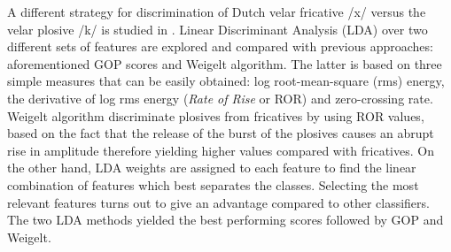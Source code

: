 A different strategy for discrimination of Dutch velar fricative /x/ versus the velar plosive
/k/ is studied in \cite{lda_weigelt}. Linear Discriminant Analysis (LDA) over two different sets
of features are explored and compared with previous approaches: aforementioned GOP scores and
Weigelt algorithm. The latter is based on three simple measures that can be easily obtained:
log root-mean-square (rms) energy, the derivative of log rms energy (\textit{Rate of Rise} or
ROR) and zero-crossing rate. Weigelt algorithm discriminate plosives from fricatives by using
ROR values, based on the fact that the release of the burst of the plosives causes an abrupt
rise in amplitude therefore yielding higher values compared with fricatives.
On the other hand, LDA weights are assigned to each feature to
find the linear combination of features
which best separates the classes. Selecting the most relevant features turns out to give an
advantage compared to other classifiers. The two LDA methods yielded the best performing
scores followed by GOP and Weigelt.


